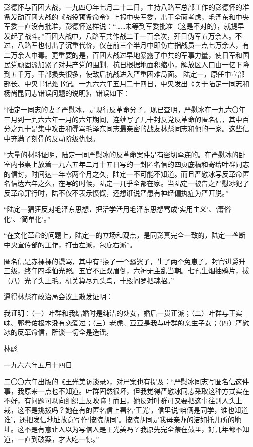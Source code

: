 \begin{maonote}
彭德怀与百团大战，一九四〇年七月二十二日，主持八路军总部工作的彭德怀的准备发动百团大战的《战役预备命令》上报中央军委，出于全面考虑，毛泽东和中央军委一直没有批准，彭德怀这样说：“……未等到军委批准（这是不对的），就提早发起了战斗。”百团大战中，八路军共作战二千一百余次，歼日伪军五万余人。不过，八路军也付出了沉重代价，仅在前三个半月中即伤亡指战员一点七万余人，有二万余人中毒。更重要的是，百团大战过早地暴露了中共的军事力量，使日军和国民党顽固派加紧了对共产党的围剿，抗日根据地面积缩小，解放区人口由一亿下降到五千万，干部损失很多，使敌后抗战进入严重困难局面。
陆定一，原任中宣部部长、中央书记处书记。一九六六年五月二十四日，中央发出《关于陆定一同志和杨尚昆同志错误问题的说明》，错误如下：

“陆定一同志的妻子严慰冰，是现行反革命分子。现已查明，严慰冰在一九六〇年三月到一九六六年一月的六年期间，连续写了几十封反党反革命的匿名信，其中百分之九十是集中攻击和辱骂毛泽东同志最亲密的战友林彪同志和他的一家。这些信中充满了刻骨的反动阶级仇恨。

“大量的材料证明，陆定一同严慰冰的反革命案件是有密切牵连的。在严慰冰的卧室内书桌上放着一九六五年二月十五日写的一封匿名信的四页底稿和寄给叶群同志的信封，时间达一年零两个月之久，陆定一不可能不知道。而且严慰冰写反革命匿名信达六年之久，在写的时候，陆定一几乎全都在家。当陆定一被告之严慰冰犯了反革命罪行时，陆不仅不表示愤慨，还想诳说严患有神经偏执症为严开脱。”

“陆定一猖狂反对毛泽东思想，把活学活用毛泽东思想骂成‘实用主义’、‘庸俗化’、‘简单化’。”

“在文化革命的问题上，陆定一的立场和观点，是同彭真完全一致的，陆定一垄断中央宣传部的工作，打击左派，包庇右派”。

匿名信是赤裸裸的谩骂，其中有“搂了一个骚婆子，生了两个兔崽子。封官进爵升三级，终年四季怕光照。五官不正双眉倒，六神无主乱当朝。七孔生烟抽鸦片，拔（八）光了头上毛。机关算尽九头鸟，十殿阎罗把魂招。”

逼得林彪在政治局会议上散发证明：

我证明：（一）叶群和我结婚时是纯洁的处女，婚后一贯正派；（二）叶群与王实味、郭希佑根本没有恋爱过；（三）老虎、豆豆是我与叶群的亲生子女；（四）严慰冰的反革命信，所谈一切全是造谣。

林彪

一九六六年五月十四日

二〇〇六年出版的《王光美访谈录》，对严案也有提及：“严慰冰同志写匿名信这件事，我原来一点也不知道。叶群固然很坏，但我觉得严慰冰同志采取这种方式实在不好，有问题可以向组织上反映嘛！而且，她反对叶群可又要把这事往别人头上栽，这不是挑拨吗？她在有的匿名信上署名‘王光’，信里说‘咱俩是同学，谁也知道谁’，还把发信地址故意写作‘按院胡同’。按院胡同是我母亲办的洁如托儿所的地址。这不是有意让人以为写信人是王光美吗？我原先完全蒙在鼓里，好几年都不知道，一直到破案，才大吃一惊。”


\end{maonote}
